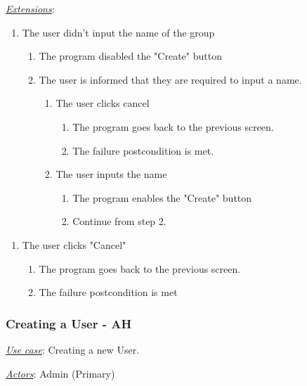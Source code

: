 \documentclass[a4paper]{article}
\begin{document}
\underline{\textit{Extensions}}:
\begin{enumerate}[label=1\alph*, leftmargin = 3em]
    \item The user didn't input the name of the group \begin{enumerate}[label=\arabic*.]
        \item The program disabled the "Create" button
        \item The user is informed that they are required to input a name.
        \begin{enumerate}[label=\alph*]
            \item The user clicks cancel \begin{enumerate}[label=\arabic*.]
                \item The program goes back to the previous screen.
                \item The failure postcondition is met.
            \end{enumerate}
            \item The user inputs the name \begin{enumerate}[label=\arabic*.]
                \item The program enables the "Create" button
                \item Continue from step 2. 
            \end{enumerate}
        \end{enumerate}
    \end{enumerate}
\end{enumerate}

\begin{enumerate}[label=4\alph*, leftmargin = 3em]
    \item The user clicks "Cancel" \begin{enumerate}[label=\arabic*.]
    \item The program goes back to the previous screen.
        \item The failure postcondition is met 
    \end{enumerate}
\end{enumerate}

\subsubsection{Creating a User - AH}
\underline{\textit{Use case}}: Creating a new User.

\underline{\textit{Actors}}: Admin (Primary)
\end{document}
